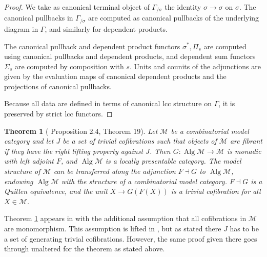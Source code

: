\documentclass[a4paper]{article}
\newtheorem{theorem}{Theorem}
\theoremstyle{remark}
\theoremstyle{definition}
\begin{document}
\begin{proof}
  We take as canonical terminal object of $\Gamma_{/ \sigma}$ the identity $\sigma \rightarrow \sigma$ on $\sigma$.
  The canonical pullbacks in $\Gamma_{/ \sigma}$ are computed as canonical pullbacks of the underlying diagram in $\Gamma$, and similarly for dependent products. 
  
  The canonical pullback and dependent product functors $\sigma^*, \Pi_s$ are computed using canonical pullbacks and dependent products, and dependent sum functors $\Sigma_s$ are computed by composition with $s$.
  Units and counits of the adjunctions are given by the evaluation maps of canonical dependent products and the projections of canonical pullbacks.

  Because all data are defined in terms of canonical lcc structure on $\Gamma$, it is preserved by strict lcc functors.
\end{proof}

\begin{theorem}[\cite{algebraic-models} Proposition 2.4, \cite{equipping-weak-equivalences} Theorem 19]
  \label{th:algebraically-fibrant-model-category}
  Let $\mathcal{M}$ be a combinatorial model category and let $J$ be a set of trivial cofibrations such that objects of $\mathcal{M}$ are fibrant if they have the right lifting property against $J$.
  Then $G : \operatorname{Alg} \mathcal{M} \rightarrow \mathcal{M}$ is monadic with left adjoint $F$, and $\operatorname{Alg} \mathcal{M}$ is a locally presentable category.
  The model structure of $\mathcal{M}$ can be transferred along the adjunction $F \dashv G$ to $\operatorname{Alg} \mathcal{M}$, endowing $\operatorname{Alg} \mathcal{M}$ with the structure of a combinatorial model category.
  $F \dashv G$ is a Quillen equivalence, and the unit $X \rightarrow G(F(X))$ is a trivial cofibration for all $X \in \mathcal{M}$.
\end{theorem}
Theorem \ref{th:algebraically-fibrant-model-category} appears in \cite{algebraic-models} with the additional assumption that all cofibrations in $\mathcal{M}$ are monomorphism.
This assumption is lifted in \cite{equipping-weak-equivalences}, but as stated there $J$ has to be a set of generating trivial cofibrations.
However, the same proof given there goes through unaltered for the theorem as stated above.
\end{document}
